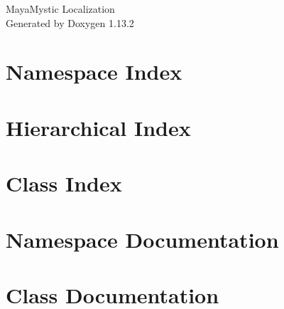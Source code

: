 \documentclass[twoside]{book}
\newcommand{\+}{\discretionary{\mbox{\scriptsize$\hookleftarrow$}}{}{}}
\newcommand{\clearemptydoublepage}{%
    \newpage{\pagestyle{empty}\cleardoublepage}%
  }
\begin{document}
  \raggedbottom
    \hypersetup{pageanchor=false,
                bookmarksnumbered=true,
                pdfencoding=unicode
               }
  \begin{titlepage}
  \vspace*{7cm}
  \begin{center}%
  {\Large Maya\+Mystic Localization}\\
  \vspace*{1cm}
  {\large Generated by Doxygen 1.13.2}\\
  \end{center}
  \end{titlepage}
  \clearemptydoublepage
  \tableofcontents
  \clearemptydoublepage
  \hypersetup{pageanchor=true}
\chapter{Namespace Index}

\chapter{Hierarchical Index}

\chapter{Class Index}

\chapter{Namespace Documentation}








\chapter{Class Documentation}



  \backmatter
  \newpage
  \clearemptydoublepage
  \printindex
\end{document}
